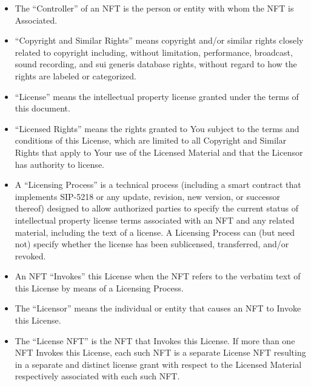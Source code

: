 \documentclass{article}
\newcommand{\eiplicense}{SIP-5218\xspace}
\newcommand{\subsect}[1]{\vspace{12pt}\noindent{\em{#1}}}
\begin{document}
\begin{sffamily}
\begin{itemize}
	\item The ``Controller'' of an NFT is the person or entity with whom the NFT is Associated.

	\end{itemize}

	\subsect{Licensing}

	\begin{itemize}	
	\item	``Copyright and Similar Rights'' means copyright and/or similar rights closely related to copyright including, without limitation, performance, broadcast, sound recording, and sui generis database rights, without regard to how the rights are labeled or categorized.

	\item	``License'' means the intellectual property license granted under the terms of this document.
		
	\item	``Licensed Rights'' means the rights granted to You subject to the terms and conditions of this License, which are limited to all Copyright and Similar Rights that apply to Your use of the Licensed Material and that the Licensor has authority to license.

	\item	A ``Licensing Process'' is a technical process (including a smart contract that implements \eiplicense or any update, revision, new version, or successor thereof) designed to allow authorized parties to specify the current status of intellectual property license terms associated with an NFT and any related material, including the text of a license. A Licensing Process can (but need not) specify whether the license has been sublicensed, transferred, and/or revoked.

	\item	An NFT ``Invokes'' this License when the NFT refers to the verbatim text of this License by means of a Licensing Process.
		
	\item	The ``Licensor'' means the individual or entity that causes an NFT to Invoke this License.
		
	\item	The ``License NFT'' is the NFT that Invokes this License. If more than one NFT Invokes this License, each such NFT is a separate License NFT resulting in a separate and distinct license grant with respect to the Licensed Material respectively associated with each such NFT.
		
	\end{itemize}
		

\end{sffamily}
\end{document}
